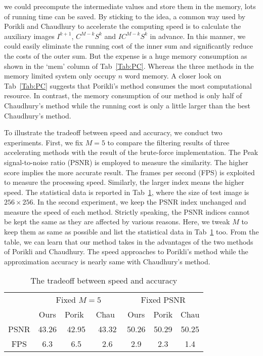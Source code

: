 \documentclass[twocolumn]{el-author}
\begin{document}
we could precompute the intermediate values and store them in the memory, lots of running time can be saved. By sticking to the idea, a common way used by Porikli and Chaudhury to accelerate the computing speed is to calculate the auxiliary images $I^{k+1}$, $C^{M-k}S^k$ and $I C^{M-k}S^k$ in advance. In this manner, we could easily eliminate the running cost of the inner sum and significantly reduce the costs of the outer sum. But the expense is a huge memory consumption as shown in the `mem' column of Tab~\ref{Tab:PC}. Whereas the three methods in the memory limited system only occupy $n$ word memory. A closer look on Tab~\ref{Tab:PC} suggests that Porikli's method consumes the most computational resource. In contrast, the memory consumption of our method is only half of Chaudhury's method while the running cost is only a little larger than the best Chaudhury's method.



To illustrate the tradeoff between speed and accuracy, we conduct two experiments. First, we fix $M = 5$ to compare the filtering results of three accelerating methods with the result of the brute-force implementation. The Peak signal-to-noise ratio (PSNR) is employed to measure the similarity. The higher score implies the more accurate result. The frames per second (FPS) is exploited to measure the processing speed. Similarly, the larger index means the higher speed. The statistical data is reported in Tab~\ref{tab:tradeoff}, where the size of test image is $256 \times 256$. In the second experiment, we keep the PSNR index unchanged and measure the speed of each method. Strictly speaking, the PSNR indices cannot be kept the same as they are affected by various reasons. Here, we tweak $M$ to keep them as same as possible and list the statistical data in Tab~\ref{tab:tradeoff} too. From the table, we can learn that our method takes in the advantages of the two methods of Porikli and Chaudhury. The speed approaches to Porikli's method while the approximation accuracy is nearly same with Chaudhury's method.

\begin{table}[h]
\caption{The tradeoff between speed and accuracy}
\begin{tabular}{|c|c|c|c|c|c|c|}
\hline
\multirow{2}{*}{} & \multicolumn{3}{c|}{Fixed $M = 5$} & \multicolumn{3}{c|}{Fixed PSNR} \\ \cline{2-7}
                  & Ours  & Porik~\cite{Porikli_CVPR_2008}  & Chau~\cite{Chaudhury_TIP_2011} & Ours  & Porik  & Chau  \\ \hline
PSNR              & 43.26 & 42.95    &  43.32    & 50.26 & 50.29    & 50.25      \\ \hline
FPS               & 6.3   & 6.5      &  2.6      & 2.9   & 2.3      & 1.4        \\ \hline
\end{tabular}
\label{tab:tradeoff}
\vspace{-0.1cm}
\end{table}
\end{document}
